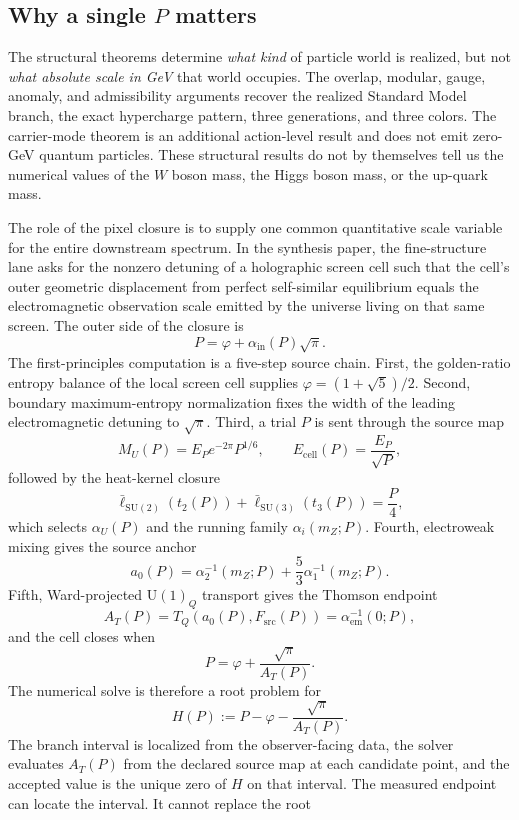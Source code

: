 \documentclass[11pt]{article}
\newcommand{\U}{\mathrm{U}}
\begin{document}
\subsection{Why a single \(P\) matters}

The structural theorems determine \emph{what kind} of particle world is
realized, but not \emph{what absolute scale in GeV} that world occupies. The overlap,
modular, gauge, anomaly, and admissibility arguments recover the realized Standard Model branch,
the exact hypercharge pattern, three generations, and three colors. The carrier-mode theorem is an
additional action-level result and does not emit zero-GeV quantum particles. These structural
results do not by themselves tell us the numerical values
of the \(W\) boson mass, the Higgs boson mass, or the up-quark mass.

The role of the pixel closure is to supply one common quantitative scale
variable for the entire downstream spectrum. In the synthesis paper, the
fine-structure lane asks for the nonzero detuning of a holographic screen cell
such that the cell's outer geometric displacement from perfect self-similar
equilibrium equals the electromagnetic observation scale emitted by the
universe living on that same screen.
The outer side of the closure is
\[
P=\varphi+\alpha_{\mathrm{in}}(P)\sqrt{\pi}.
\]
The first-principles computation is a five-step source chain. First, the
golden-ratio entropy balance of the local screen cell supplies
\(\varphi=(1+\sqrt5)/2\). Second, boundary maximum-entropy normalization fixes
the width of the leading electromagnetic detuning to \(\sqrt{\pi}\). Third, a
trial \(P\) is sent through the source map
\[
M_U(P)=E_P e^{-2\pi}P^{1/6},\qquad E_{\mathrm{cell}}(P)=\frac{E_P}{\sqrt P},
\]
followed by the heat-kernel closure
\[
\bar\ell_{\mathrm{SU}(2)}(t_2(P))+\bar\ell_{\mathrm{SU}(3)}(t_3(P))=\frac{P}{4},
\]
which selects \(\alpha_U(P)\) and the running family
\(\alpha_i(m_Z;P)\). Fourth, electroweak mixing gives the source anchor
\[
a_0(P)=\alpha_2^{-1}(m_Z;P)+\frac53\alpha_1^{-1}(m_Z;P).
\]
Fifth, Ward-projected \(\U(1)_Q\) transport gives the Thomson endpoint
\[
A_T(P)=T_Q(a_0(P),F_{\mathrm{src}}(P))=\alpha_{\mathrm{em}}^{-1}(0;P),
\]
and the cell closes when
\[
P=\varphi+\frac{\sqrt{\pi}}{A_T(P)}.
\]
The numerical solve is therefore a root problem for
\[
H(P):=P-\varphi-\frac{\sqrt{\pi}}{A_T(P)}.
\]
The branch interval is localized from the observer-facing data, the solver evaluates \(A_T(P)\)
from the declared source map at each candidate point, and the accepted value is the unique zero of
\(H\) on that interval. The measured endpoint can locate the interval. It cannot replace the root
\end{document}
